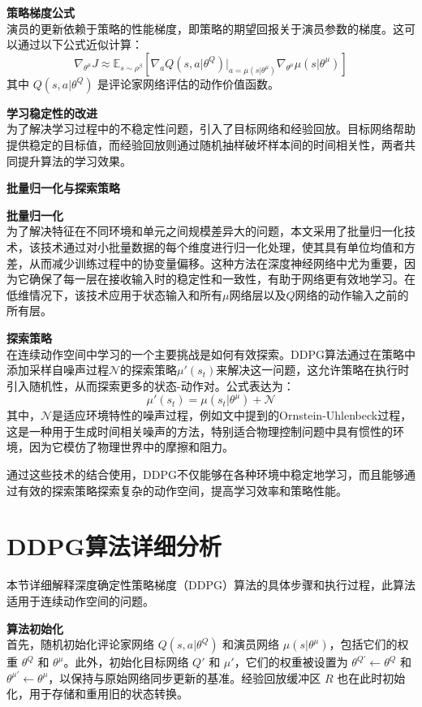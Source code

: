 \documentclass[twocolumn, 10pt]{article} %
\theoremstyle{remark}
\begin{document}
\textbf{策略梯度公式}\\
演员的更新依赖于策略的性能梯度，即策略的期望回报关于演员参数的梯度。这可以通过以下公式近似计算：
\[
\nabla_{\theta^\mu} J \approx \mathbb{E}_{s \sim \rho^\beta} \left[ 
\nabla_a Q(s, a|\theta^Q) \big|_{a = \mu(s|\theta^\mu)} 
\nabla_{\theta^\mu} \mu(s|\theta^\mu)
\right]
\]
其中 $Q(s, a|\theta^Q)$ 是评论家网络评估的动作价值函数。

\textbf{学习稳定性的改进}\\
为了解决学习过程中的不稳定性问题，引入了目标网络和经验回放。目标网络帮助提供稳定的目标值，而经验回放则通过随机抽样破坏样本间的时间相关性，两者共同提升算法的学习效果。

\textbf{批量归一化与探索策略}

\textbf{批量归一化}\\
为了解决特征在不同环境和单元之间规模差异大的问题，本文采用了批量归一化技术，该技术通过对小批量数据的每个维度进行归一化处理，使其具有单位均值和方差，从而减少训练过程中的协变量偏移。这种方法在深度神经网络中尤为重要，因为它确保了每一层在接收输入时的稳定性和一致性，有助于网络更有效地学习。在低维情况下，该技术应用于状态输入和所有$\mu$网络层以及$Q$网络的动作输入之前的所有层。

\textbf{探索策略}\\
在连续动作空间中学习的一个主要挑战是如何有效探索。DDPG算法通过在策略中添加采样自噪声过程$\mathcal{N}$的探索策略$\mu'(s_t)$来解决这一问题，这允许策略在执行时引入随机性，从而探索更多的状态-动作对。公式表达为：
\[
\mu'(s_t) = \mu(s_t|\theta^\mu) + \mathcal{N}
\]
其中，$\mathcal{N}$是适应环境特性的噪声过程，例如文中提到的Ornstein-Uhlenbeck过程，这是一种用于生成时间相关噪声的方法，特别适合物理控制问题中具有惯性的环境，因为它模仿了物理世界中的摩擦和阻力。

通过这些技术的结合使用，DDPG不仅能够在各种环境中稳定地学习，而且能够通过有效的探索策略探索复杂的动作空间，提高学习效率和策略性能。


\section{DDPG算法详细分析}

本节详细解释深度确定性策略梯度（DDPG）算法的具体步骤和执行过程，此算法适用于连续动作空间的问题。

\textbf{算法初始化}\\
首先，随机初始化评论家网络 $Q(s, a|\theta^Q)$ 和演员网络 $\mu(s|\theta^\mu)$，包括它们的权重 $\theta^Q$ 和 $\theta^\mu$。此外，初始化目标网络 $Q'$ 和 $\mu'$，它们的权重被设置为 $\theta^{Q'} \leftarrow \theta^Q$ 和 $\theta^{\mu'} \leftarrow \theta^\mu$，以保持与原始网络同步更新的基准。经验回放缓冲区 $R$ 也在此时初始化，用于存储和重用旧的状态转换。
\end{document}
